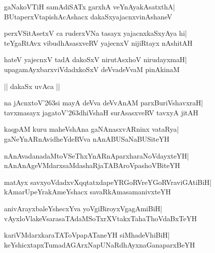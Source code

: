 \documentclass[twoside,12pt,openright]{book}
\def\S{\char'263}
\newcounter{shloka}[chapter]
\begin{document}
\begin{shloka}%
gaNakoVTiH samAdiSATx garxhA veYnAyakAsatxthA|\\
BUtaperxVtapishAcAshacx dakaSxyajacnxvinAshaneV
\end{shloka}

\begin{shloka}%
perxVSitAsetxV ca ruderxVNa tasayx yajacnxkaSxyAya hi|\\
teYgaRtAvx vibudhAsasxveRV yajecnxV nijiRtayx nAshitAH
\end{shloka}

\begin{shloka}%
hateV yajecnxV tadA dakoSxV nirutAsxhoV nirudayxmaH|\\
upagamAyxbarxviVdadxkoSxV deVvadeVvaM pinAkinaM
\end{shloka}

\begin{center}
|| dakaSx uvAca ||
\end{center}
\begin{shloka}%
na jAcnxtoV\S si mayA deVva deVvAnAM parxBuriVshavxraH|\\
tavxmasayx jagatoV\S dhiVshaH surAsasxveRV tavxyA jitAH
\end{shloka}

\begin{shloka}%
kaqpAM kuru maheVshAna gaNAnasxvARninx vataRya|\\
gaNeYnARnAvidheYdeRVva nAnABUSaNaBUSiteYH
\end{shloka}

\begin{shloka}%
nAnAvadanadaMtoVSeThxYnARnAparxharaNoVdayxteYH|\\
nAnAnAgeVMdarxsaMdashaRjaTABAroVpashoVBiteYH
\end{shloka}

\begin{shloka}%
matAyx savxyoVdadxvXqqtatxdapeYRGoRVreYGoRVraviGAtiBiH|\\
kAmarUpeYrakAmeYshacx savaRkAmasamanivxteYH
\end{shloka}

\begin{shloka}%
anivArayxbaleYshecxYva yoVgiBiroyxVgagAmiBiH|\\
vAyxloVlakeVsarasaTAdaMSoTxrXVtakxTahaThoVdaBxTeYH
\end{shloka}

\begin{shloka}%
kariVMdarxkaraTAToVpapATaneYH siMhadeVhiBiH|\\
keYshicxtapxTumadAGArxNapUNaRdhAyxnaGanaparxBeYH
\end{shloka}
\end{document}
